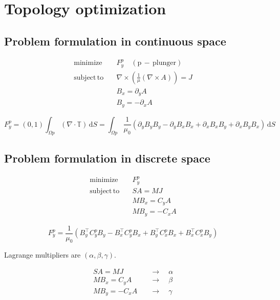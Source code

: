 \newpage
\chapter{Topology optimization}

\section{Problem formulation in continuous space}

\begin{align*} 
\mathrm{minimize}\quad  &  F_y^p \quad \mathrm{(p\,-\,plunger)} \\
\mathrm{subject \, to}\quad  &  \nabla \times \left( \frac{1}{\mu} \left( \nabla \times A \right) \right) = J \\
&  B_x = \partial_y A \\
&  B_y = - \partial_x A
\end{align*}

\begin{equation} \label{eq:43} 
F_y^p = \left(0,1\right) \int_{\Omega p} \left( \nabla \cdot \mathbb{T} \right) \,\mathrm{d}S = \int_{\Omega p} \frac{1}{\mu_0} \left( \partial_y B_y B_y - \partial_y B_x B_x + \partial_x B_x B_y + \partial_x B_y B_x \right) \,\mathrm{d}S
\end{equation}

\section{Problem formulation in discrete space}

\begin{align*} 
\mathrm{minimize}\quad  &  F_y^p \\
\mathrm{subject \, to}\quad  &  S A = M J \\
&  M B_x = C_y A \\
&  M B_y = -C_x A 
\end{align*}


\begin{equation} \label{eq:44} 
F_y^p = \frac{1}{\mu_0} \left(B_y^{\top} C_y^p B_y - B_x^{\top} C_y^p B_x + B_y^{\top} C_x^p B_x + B_x^{\top} C_x^p B_y \right)
\end{equation}

\noindent Lagrange multipliers are $\left(\alpha, \beta, \gamma \right)$.

\begin{align*} 
S A = M J \quad &\rightarrow \quad \alpha \\
M B_x = C_y A \quad &\rightarrow \quad \beta \\
M B_y = -C_x A \quad &\rightarrow \quad \gamma \\
\end{align*}

